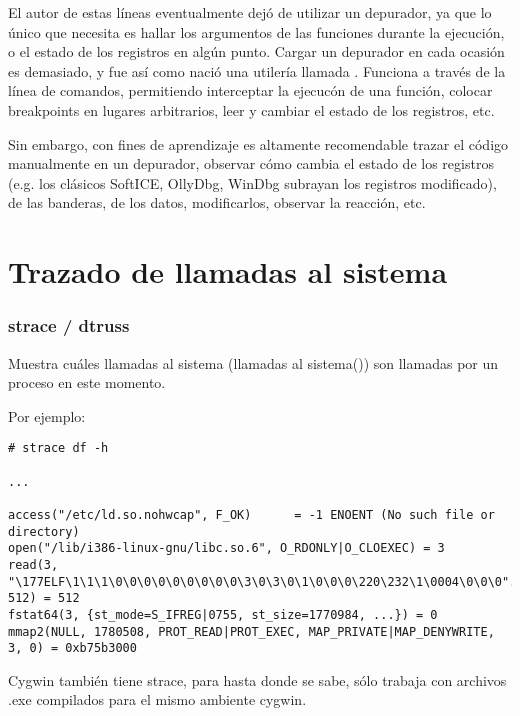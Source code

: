 El autor de estas l\'ineas eventualmente dej\'o de utilizar un depurador, ya que lo \'unico que necesita es hallar los argumentos
de las funciones durante la ejecuci\'on, o el estado de los registros en alg\'un punto.
Cargar un depurador en cada ocasi\'on es demasiado, y fue as\'i como naci\'o una utiler\'ia llamada .
Funciona a trav\'es de la l\'inea de comandos, permitiendo interceptar la ejecuc\'on de una funci\'on,
colocar breakpoints en lugares arbitrarios, leer y cambiar el estado de los registros, etc.

Sin embargo, con fines de aprendizaje es altamente recomendable trazar el c\'odigo manualmente en un depurador,
observar c\'omo cambia el estado de los registros (e.g. los cl\'asicos SoftICE, OllyDbg, WinDbg subrayan los registros modificado),
de las banderas, de los datos, modificarlos, observar la reacci\'on, etc.

\section{Trazado de llamadas al sistema}

\label{strace}
\subsubsection{strace / dtruss}

Muestra cu\'ales llamadas al sistema (llamadas al sistema()) son llamadas por un proceso en este momento.

Por ejemplo:

\begin{lstlisting}
# strace df -h

...

access("/etc/ld.so.nohwcap", F_OK)      = -1 ENOENT (No such file or directory)
open("/lib/i386-linux-gnu/libc.so.6", O_RDONLY|O_CLOEXEC) = 3
read(3, "\177ELF\1\1\1\0\0\0\0\0\0\0\0\0\3\0\3\0\1\0\0\0\220\232\1\0004\0\0\0"..., 512) = 512
fstat64(3, {st_mode=S_IFREG|0755, st_size=1770984, ...}) = 0
mmap2(NULL, 1780508, PROT_READ|PROT_EXEC, MAP_PRIVATE|MAP_DENYWRITE, 3, 0) = 0xb75b3000
\end{lstlisting}

\myindex{\MacOSX}
%
%
%
\PTBRph{}%
\DEph{}\PLph{}%
\ITAph{}

Cygwin tambi\'en tiene strace, para hasta donde se sabe, s\'olo trabaja con archivos .exe
compilados para el mismo ambiente cygwin.

